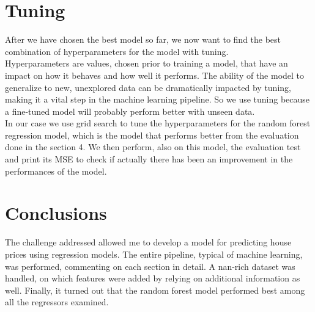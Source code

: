\documentclass[10pt, notitlepage]{article}
\begin{document}
\section{Tuning}
\color{black}
After we have chosen the best model so far, we now want to find the best combination of hyperparameters for the model with tuning.
\\
Hyperparameters are values, chosen prior to training a model, that have an impact on how it behaves and how well it performs. The ability of the model to generalize to new, unexplored data can be dramatically impacted by tuning, making it a vital step in the machine learning pipeline. So we use tuning because a fine-tuned model will probably perform better with unseen data.
\\
In our case we use grid search to tune the hyperparameters for the random forest regression model, which is the model that performs better from the evaluation done in the section 4. We then perform, also on this model, the evaluation test and print its MSE to check if actually there has been an improvement in the performances of the model. 

\color{blue}
\section{Conclusions}
\color{black}
The challenge addressed allowed me to develop a model for predicting house prices using regression models. The entire pipeline, typical of machine learning, was performed, commenting on each section in detail. A nan-rich dataset was handled, on which features were added by relying on additional information as well. Finally, it turned out that the random forest model performed best among all the regressors examined. 
\end{document}
